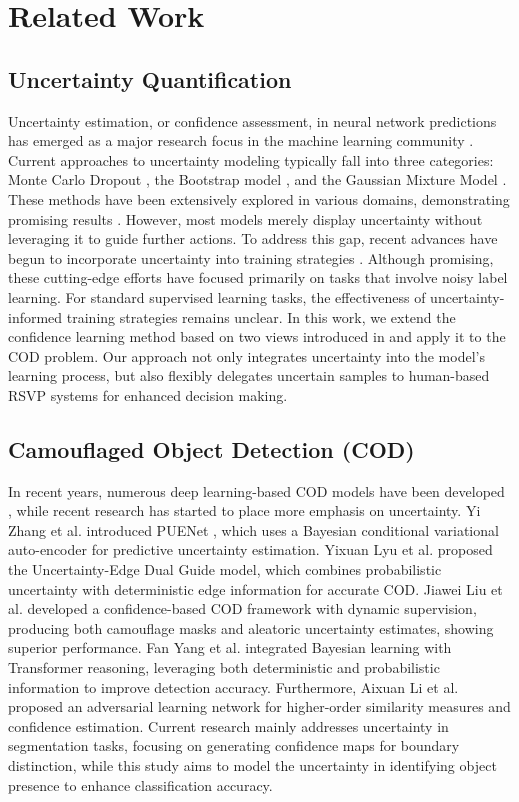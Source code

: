 \documentclass[preprint,12pt,authoryear]{elsarticle}
\begin{document}
\section{Related Work}
\subsection{Uncertainty Quantification}
Uncertainty estimation, or confidence assessment, in neural network predictions has emerged as a major research focus in the machine learning community \cite{smith2024uncertainty}. Current approaches to uncertainty modeling typically fall into three categories: Monte Carlo Dropout \cite{neal2012bayesian, Moreau_2022_WACV, gal2017concrete, kang2023active}, the Bootstrap model \cite{osband2016deep}, and the Gaussian Mixture Model \cite{9666964, zhang2019short}. These methods have been extensively explored in various domains, demonstrating promising results \cite{abdar2021review}. However, most models merely display uncertainty without leveraging it to guide further actions. To address this gap, recent advances have begun to incorporate uncertainty into training strategies \cite{li2023disc,cordeiro2023longremix}. Although promising, these cutting-edge efforts have focused primarily on tasks that involve noisy label learning. For standard supervised learning tasks, the effectiveness of uncertainty-informed training strategies remains unclear. In this work, we extend the confidence learning method based on two views introduced in \cite{li2023disc} and apply it to the COD problem. Our approach not only integrates uncertainty into the model's learning process, but also flexibly delegates uncertain samples to human-based RSVP systems for enhanced decision making.

\subsection{Camouflaged Object Detection (COD)}
In recent years, numerous deep learning-based COD models have been developed \cite{liang2024systematic}, while recent research has started to place more emphasis on uncertainty. Yi Zhang et al. introduced PUENet \cite{10159663}, which uses a Bayesian conditional variational auto-encoder for predictive uncertainty estimation. Yixuan Lyu et al. \cite{10183371} proposed the Uncertainty-Edge Dual Guide model, which combines probabilistic uncertainty with deterministic edge information for accurate COD. Jiawei Liu et al. \cite{9706783} developed a confidence-based COD framework with dynamic supervision, producing both camouflage masks and aleatoric uncertainty estimates, showing superior performance. Fan Yang et al. \cite{9710683} integrated Bayesian learning with Transformer reasoning, leveraging both deterministic and probabilistic information to improve detection accuracy. Furthermore, Aixuan Li et al. \cite{9578707} proposed an adversarial learning network for higher-order similarity measures and confidence estimation. Current research mainly addresses uncertainty in segmentation tasks, focusing on generating confidence maps for boundary distinction, while this study aims to model the uncertainty in identifying object presence to enhance classification accuracy.
\end{document}
